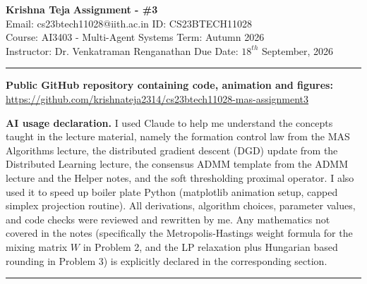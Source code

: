 \documentclass[a4paper, 11pt]{article}
\begin{document}
\noindent
\large\textbf{Krishna Teja} \hfill \textbf{Assignment - \#3}   \\
Email: cs23btech11028@iith.ac.in \hfill ID: CS23BTECH11028 \\
\normalsize Course: AI3403 - Multi-Agent Systems \hfill Term: Autumn 2026\\
Instructor: Dr. Venkatraman Renganathan \hfill Due Date: $18^{th}$ September, 2026 \\
\noindent\rule{7in}{2.8pt}

\textbf{Public GitHub repository containing code, animation and figures:}\\
\url{https://github.com/krishnateja2314/cs23btech11028-mas-assignment3}

\medskip
\textbf{AI usage declaration.} I used Claude to help me understand the concepts taught in the lecture material, namely the formation control law from the MAS Algorithms lecture, the distributed gradient descent (DGD) update from the Distributed Learning lecture, the consensus ADMM template from the ADMM lecture and the Helper notes, and the soft thresholding proximal operator. I also used it to speed up boiler plate Python (matplotlib animation setup, capped simplex projection routine). All derivations, algorithm choices, parameter values, and code checks were reviewed and rewritten by me. Any mathematics not covered in the notes (specifically the Metropolis-Hastings weight formula for the mixing matrix $W$ in Problem 2, and the LP relaxation plus Hungarian based rounding in Problem 3) is explicitly declared in the corresponding section.

\medskip
\noindent\rule{7in}{2.8pt}
\end{document}
